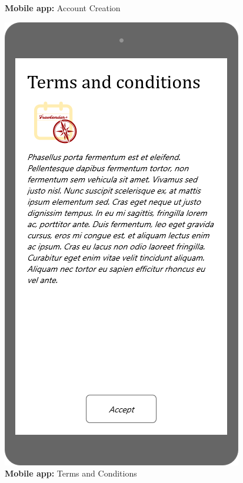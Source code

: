 \documentclass{article}
\begin{document}
\begin{figure}[H]
			\caption{\textbf{Mobile app:} Account Creation}\label{fig:MU1}
			\endminipage\hfill
			\includegraphics[width=\linewidth]{Images/Mockup/Mobile/02-Terms_and_conditions.png}
  			\caption{\textbf{Mobile app:} Terms and Conditions}\label{fig:MU2}
			\endminipage
			\end{figure}
		\newpage
\end{document}
